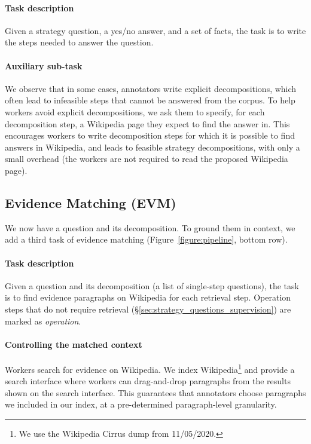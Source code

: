 {\paragraph{Task description} Given a strategy question, a yes/no answer, and a set of facts, the task is to write the steps needed to answer the question.

\paragraph{Auxiliary sub-task} 
We observe that in some cases, annotators write explicit decompositions, which often lead to infeasible steps that cannot be answered from the corpus. 
To help workers avoid explicit decompositions, we ask them to specify, for each decomposition step, a Wikipedia page they expect to find the answer in. This encourages workers to write decomposition steps for which it is possible to find answers in Wikipedia, and leads to feasible strategy decompositions, with only a small overhead (the workers are not required to read the proposed Wikipedia page).

\subsection{Evidence Matching (EVM)}
\label{subsection:evm}
We now have a question and its decomposition. To ground them in context, we add a third task of evidence matching (Figure~\ref{figure:pipeline}, bottom row).

\paragraph{Task description} Given a question and its decomposition (a list of single-step questions), the task is to find evidence paragraphs on Wikipedia for each retrieval step. Operation steps that do not require retrieval (\S\ref{sec:strategy_questions_supervision}) are marked as  \emph{operation}.

\paragraph{Controlling the matched context} Workers search for evidence on Wikipedia. 
We index Wikipedia\footnote{We use the Wikipedia Cirrus dump from 11/05/2020. 
} and provide a search interface where workers can drag-and-drop paragraphs from the results shown on the search interface. 
This guarantees that annotators choose paragraphs we included in our index, at a pre-determined paragraph-level granularity. 

}
